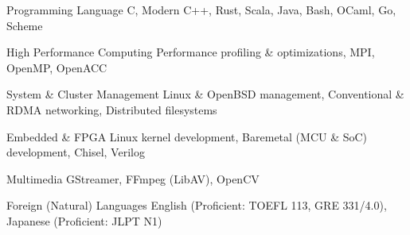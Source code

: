 

\begin{cvskills}

  \cvskill
    {Programming Language} %
    {C, Modern C++, Rust, Scala, Java, Bash, OCaml, Go, Scheme} %

  \cvskill
    {High Performance Computing} %
    {Performance profiling \& optimizations, MPI, OpenMP, OpenACC} %

  \cvskill
    {System \& Cluster Management} %
    {Linux \& OpenBSD management, Conventional \& RDMA networking, Distributed filesystems} %

  \cvskill
    {Embedded \& FPGA}
    {Linux kernel development, Baremetal (MCU \& SoC) development, Chisel, Verilog}

  \cvskill
    {Multimedia}
    {GStreamer, FFmpeg (LibAV), OpenCV}

  \cvskill
    {Foreign (Natural) Languages} %
    {English (Proficient: TOEFL 113, GRE 331/4.0), Japanese (Proficient: JLPT N1)} %

\end{cvskills}
